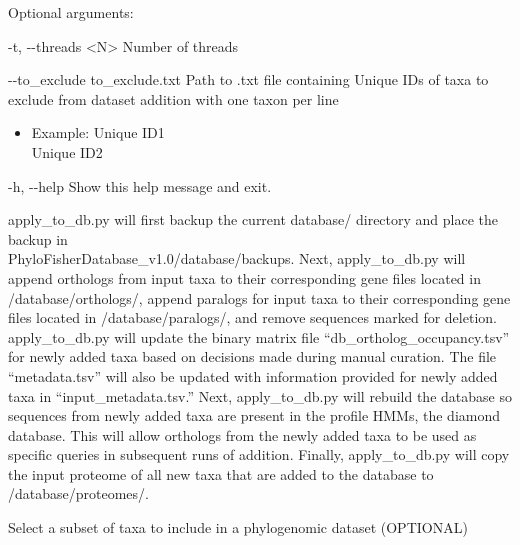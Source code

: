 \documentclass{article}
\begin{document}
\begin{enumerate}[itemsep=12pt]
\begin{description}
        \item Optional arguments:
        \begin{description}
            \item -t, -\/-threads \hspace{0.2cm} <N> \hspace{0.2cm} Number of threads
            \item -\/-to\_exclude \hspace{0.2cm} to\_exclude.txt \hspace{0.2cm} Path to .txt file containing Unique IDs of taxa to exclude from dataset addition with one taxon per line
            \begin{itemize}
                \item Example: Unique ID1\\
                \hspace*{1.6cm}Unique ID2
            \end{itemize}
            \item -h, -\/-help \hspace{0.2cm} Show this help message and exit.
        \end{description}
    \end{description}
    \vspace{0.3cm}
    apply\_to\_db.py will first backup the current database/ directory and place the backup in \\
    PhyloFisherDatabase\_v1.0/database/backups. Next, apply\_to\_db.py will append orthologs from input taxa to their corresponding gene files located in /database/orthologs/, append paralogs for input taxa to their corresponding gene files located in /database/paralogs/, and remove sequences marked for deletion. apply\_to\_db.py will update the binary matrix file “db\_ortholog\_occupancy.tsv” for newly added taxa based on decisions made during manual curation. The file “metadata.tsv” will also be updated with information provided for newly added taxa in “input\_metadata.tsv.” Next, apply\_to\_db.py will rebuild the database so sequences from newly added taxa are present in the profile HMMs, the diamond database. This will allow orthologs from the newly added taxa to be used as specific queries in subsequent runs of addition. Finally, apply\_to\_db.py will copy the input proteome of all new taxa that are added to the database to /database/proteomes/.
    
    \item Select a subset of taxa to include in a phylogenomic dataset (OPTIONAL)
    

\end{enumerate}
\end{document}
